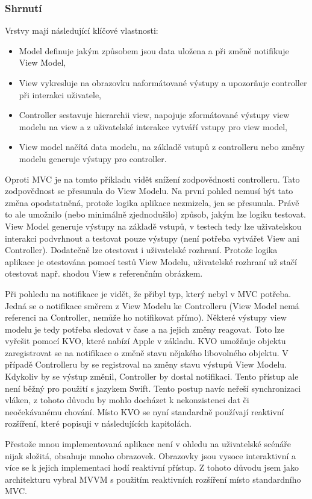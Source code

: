 \subsubsection{Shrnutí}

Vrstvy mají následující klíčové vlastnosti:
\begin{itemize}
  \item Model definuje jakým způsobem jsou data uložena a při změně notifikuje View Model,
  \item View vykresluje na obrazovku naformátované výstupy a upozorňuje controller při interakci uživatele,
  \item Controller sestavuje hierarchii view, napojuje zformátované výstupy view modelu na view a z uživatelské interakce vytváří vstupy pro view model,
  \item View model načítá data modelu, na základě vstupů z controlleru nebo změny modelu generuje výstupy pro controller.
\end{itemize}

Oproti MVC je na tomto příkladu vidět snížení zodpovědnosti controlleru. Tato zodpovědnost se přesunula do View Modelu.
Na první pohled nemusí být tato změna opodstatněná, protože logika aplikace nezmizela, jen se přesunula.
Právě to ale umožnilo (nebo minimálně zjednodušilo) způsob, jakým lze logiku testovat.
View Model generuje výstupy na základě vstupů, v testech tedy lze uživatelskou interakci podvrhnout a testovat pouze výstupy (není potřeba vytvářet View ani Controller).
Dodatečně lze otestovat i uživatelské rozhraní.
Protože logika aplikace je otestována pomocí testů View Modelu, uživatelské rozhraní už stačí otestovat např. shodou View s referenčním obrázkem.

Při pohledu na notifikace je vidět, že přibyl typ, který nebyl v MVC potřeba.
Jedná se o notifikace směrem z View Modelu ke Controlleru (View Model nemá referenci na Controller, nemůže ho notifikovat přímo).
Některé výstupy view modelu je tedy potřeba sledovat v čase a na jejich změny reagovat.
Toto lze vyřešit pomocí KVO, které nabízí Apple v základu.
KVO umožňuje objektu zaregistrovat se na notifikace o změně stavu nějakého libovolného objektu.
V případě Controlleru by se registroval na změny stavu výstupů View Modelu.
Kdykoliv by se výstup změnil, Controller by dostal notifikaci.
Tento přístup ale není běžný pro použití s jazykem Swift.
Tento postup navíc neřeší synchronizaci vláken, z tohoto důvodu by mohlo docházet k nekonzistenci dat či neočekávanému chování.
Místo KVO se nyní standardně používají reaktivní rozšíření, které popisuji v následujících kapitolách.

Přestože mnou implementovaná aplikace není v ohledu na uživatelské scénáře nijak složitá, obsahuje mnoho obrazovek.
Obrazovky jsou vysoce interaktivní a více se k jejich implementaci hodí reaktivní přístup.
Z tohoto důvodu jsem jako architekturu vybral MVVM s použitím reaktivních rozšíření místo standardního MVC.
